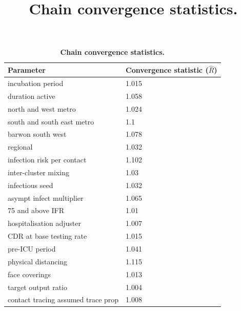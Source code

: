 \begin{table}[ht]
\renewcommand{\baselinestretch}{1}
	\begin{tabular}[ht]{| p{7cm} | p{6cm} |}
	\hline
		\textbf{Parameter} & \textbf{Convergence statistic} (\(\hat{R}\)) \\
		
\hline incubation period & 1.015 \\

\hline duration active & 1.058 \\

\hline north and west metro & 1.024 \\

\hline south and south east metro & 1.1 \\

\hline barwon south west & 1.078 \\

\hline regional & 1.032 \\

\hline infection risk per contact & 1.102 \\

\hline inter-cluster mixing & 1.03 \\

\hline infectious seed & 1.032 \\

\hline asympt infect multiplier & 1.065 \\

\hline 75 and above IFR & 1.01 \\

\hline hospitalisation adjuster & 1.007 \\

\hline CDR at base testing rate & 1.015 \\

\hline pre-ICU period & 1.041 \\

\hline physical distancing & 1.115 \\

\hline face coverings & 1.013 \\

\hline target output ratio & 1.004 \\

\hline contact tracing assumed trace prop & 1.008 \\

	\hline
    \end{tabular}
    \title{Chain convergence statistics.}
    \caption{\textbf{Chain convergence statistics.}}	
    \label{tab:convergence}
\end{table}


